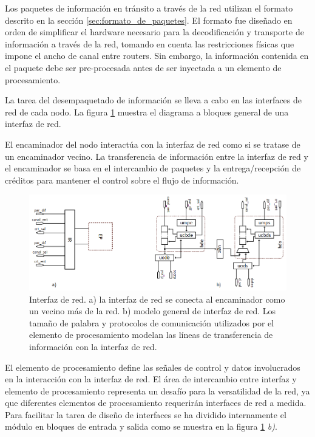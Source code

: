 Los paquetes de información en tránsito a través de la red utilizan el formato descrito en la sección \ref{sec:formato_de_paquetes}. El formato fue diseñado en orden de simplificar el hardware necesario para la decodificación y transporte de información a través de la red, tomando en cuenta las restricciones físicas que impone el ancho de canal entre routers. Sin embargo, la información contenida en el paquete debe ser pre-procesada antes de ser inyectada a un elemento de procesamiento.

La tarea del desempaquetado de información se lleva a cabo en las interfaces de red de cada nodo. La figura \ref{fig:ch4_interfaz_de_red_top} muestra el diagrama a bloques general de una interfaz de red.

El encaminador del nodo interactúa con la interfaz de red como si se tratase de un encaminador vecino. La transferencia de información entre la interfaz de red y el encaminador se basa en el intercambio de paquetes y la entrega/recepción de créditos para mantener el control sobre el flujo de información.


\begin{figure}
	\begin{center}
		\includegraphics[scale=0.6]{figures/ch4_interfaz_de_red_top.png}
	\end{center}
	\caption
		{	
			Interfaz de red. a) la interfaz de red se conecta al encaminador como un vecino más de la red. b) modelo general de interfaz de red. Los tamaño de palabra y protocolos de comunicación utilizados por el elemento de procesamiento modelan las líneas de transferencia de información con la interfaz de red.
		}
	\label{fig:ch4_interfaz_de_red_top}
\end{figure}

El elemento de procesamiento define las señales de control y datos involucrados en la interacción con la interfaz de red. El área de intercambio entre interfaz y elemento de procesamiento representa un desafío para la versatilidad de la red, ya que diferentes elementos de procesamiento requerirán interfaces de red a medida. Para facilitar la tarea de diseño de interfaces se ha dividido internamente el módulo en bloques de entrada y salida como se muestra en la figura \ref{fig:ch4_interfaz_de_red_top} \textit{b)}.

